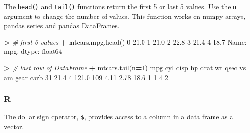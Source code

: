 \documentclass[
]{book}
\newenvironment{Shaded}{\begin{snugshade}}{\end{snugshade}}
\newcommand{\CommentTok}[1]{\textcolor[rgb]{0.56,0.35,0.01}{\textit{#1}}}
\newcommand{\DecValTok}[1]{\textcolor[rgb]{0.00,0.00,0.81}{#1}}
\newcommand{\FloatTok}[1]{\textcolor[rgb]{0.00,0.00,0.81}{#1}}
\newcommand{\NormalTok}[1]{#1}
\newcommand{\OperatorTok}[1]{\textcolor[rgb]{0.81,0.36,0.00}{\textbf{#1}}}
\newcommand{\SpecialCharTok}[1]{\textcolor[rgb]{0.00,0.00,0.00}{#1}}
\begin{document}
The \texttt{head()} and \texttt{tail()} functions return the first 5 or last 5 values. Use the \texttt{n} argument to change the number of values. This function works on numpy arrays, pandas series and pandas DataFrames.

\begin{Shaded}
\begin{Highlighting}[]
\OperatorTok{\textgreater{}} \CommentTok{\# first 6 values}
\OperatorTok{+}\NormalTok{ mtcars.mpg.head()}
\DecValTok{0}    \FloatTok{21.0}
\DecValTok{1}    \FloatTok{21.0}
\DecValTok{2}    \FloatTok{22.8}
\DecValTok{3}    \FloatTok{21.4}
\DecValTok{4}    \FloatTok{18.7}
\NormalTok{Name: mpg, dtype: float64}
\end{Highlighting}
\end{Shaded}

\begin{Shaded}
\begin{Highlighting}[]
\OperatorTok{\textgreater{}} \CommentTok{\# last row of DataFrame}
\OperatorTok{+}\NormalTok{ mtcars.tail(n}\OperatorTok{=}\DecValTok{1}\NormalTok{)}
\NormalTok{     mpg  cyl   disp   hp  drat    wt  qsec  vs  am  gear  carb}
\DecValTok{31}  \FloatTok{21.4}    \DecValTok{4}  \FloatTok{121.0}  \DecValTok{109}  \FloatTok{4.11}  \FloatTok{2.78}  \FloatTok{18.6}   \DecValTok{1}   \DecValTok{1}     \DecValTok{4}     \DecValTok{2}
\end{Highlighting}
\end{Shaded}

\hypertarget{r-18}{%
\subsubsection*{R}\label{r-18}}

The dollar sign operator, \texttt{\$}, provides access to a column in a data frame as a vector.

\begin{Shaded}
\end{Shaded}
\end{document}
